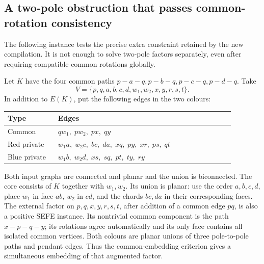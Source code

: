 \subsection{A two-pole obstruction that passes common-rotation consistency}
\label{ver:two-pole}

The following instance tests the precise extra constraint retained by the
new compilation. It is not enough to solve two-pole factors separately,
even after requiring compatible common rotations globally.

Let $K$ have the four common paths $p-a-q,p-b-q,p-c-q,p-d-q$. Take
\[
 V=\{p,q,a,b,c,d,w_1,w_2,x,y,r,s,t\}.
\]
In addition to $E(K)$, put the following edges in the two colours:
\begin{center}
\begin{tabular}{p{0.2\linewidth}p{0.7\linewidth}}
\toprule
Type & Edges \\
\midrule
Common & $qw_1,\;pw_2,\;px,\;qy$ \\
Red private & $w_1a,\;w_2c,\;bc,\;da,\;xq,\;py,\;xr,\;ps,\;qt$ \\
Blue private & $w_1b,\;w_2d,\;xs,\;sq,\;pt,\;ty,\;ry$ \\
\bottomrule
\end{tabular}
\end{center}

Both input graphs are connected and planar and the union is biconnected.
The core consists of $K$ together with $w_1,w_2$. Its union is planar: use the order
$a,b,c,d$, place $w_1$ in face $ab$, $w_2$ in $cd$, and the chords $bc,da$
in their corresponding faces. The external factor on $p,q,x,y,r,s,t$,
after addition of a common edge $pq$, is also a positive SEFE instance.
Its nontrivial common component is the path $x-p-q-y$; its rotations
agree automatically and its only face contains all isolated common vertices.
Both colours are planar unions of three pole-to-pole paths and pendant
edges. Thus the common-embedding criterion gives a simultaneous embedding
of that augmented factor.

